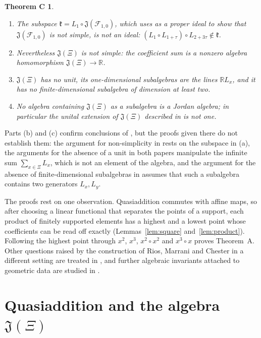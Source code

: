 \documentclass[11pt]{amsart}
\newtheorem*{theoremC}{Theorem C}
\theoremstyle{definition}
\theoremstyle{remark}
\newcommand{\R}{\mathbb{R}}
\newcommand{\J}{\mathfrak{J}}
\begin{document}
\begin{theoremC}
\begin{enumerate}
\item[(a)] The subspace $\mathfrak k=L_1\circ\J(\mathcal F_{1,0})$, which \cite{CCAI23} uses as a proper ideal to show that $\J(\mathcal F_{1,0})$ is not simple, is not an ideal: $(L_1\circ L_{1+\tau})\circ L_{2+3\tau}\notin\mathfrak k$.
\item[(b)] Nevertheless $\J(\Xi)$ is not simple: the coefficient sum is a nonzero algebra homomorphism $\J(\Xi)\to\R$.
\item[(c)] $\J(\Xi)$ has no unit, its one-dimensional subalgebras are the lines $\R L_x$, and it has no finite-dimensional subalgebra of dimension at least two.
\item[(d)] No algebra containing $\J(\Xi)$ as a subalgebra is a Jordan algebra; in particular the unital extension of $\J(\Xi)$ described in \cite[Section~5]{CCAI25} is not one.
\end{enumerate}
\end{theoremC}

Parts (b) and (c) confirm conclusions of \cite{CCAI23,CCAI25}, but the proofs given there do not establish them: the argument for non-simplicity in \cite{CCAI23} rests on the subspace in (a), the arguments for the absence of a unit in both papers manipulate the infinite sum $\sum_{x\in\Xi}L_x$, which is not an element of the algebra, and the argument for the absence of finite-dimensional subalgebras in \cite{CCAI25} assumes that such a subalgebra contains two generators $L_x,L_y$.

The proofs rest on one observation. Quasiaddition commutes with affine maps, so after choosing a linear functional that separates the points of a support, each product of finitely supported elements has a highest and a lowest point whose coefficients can be read off exactly (Lemmas~\ref{lem:square} and~\ref{lem:product}). Following the highest point through $x^2$, $x^3$, $x^2\circ x^2$ and $x^3\circ x$ proves Theorem~A. Other questions raised by the construction of Rios, Marrani and Chester in a different setting are treated in \cite{Bha26,Arch}, and further algebraic invariants attached to geometric data are studied in \cite{Bha22,Bha26b}.

\section{Quasiaddition and the algebra \texorpdfstring{$\J(\Xi)$}{J(Xi)}}
\end{document}
